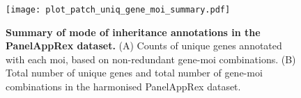 \begin{figure}[ht]
    \centering
    \texttt{[image: plot\_patch\_uniq\_gene\_moi\_summary.pdf]}
\caption{\textbf{Summary of mode of inheritance annotations in the PanelAppRex dataset.}
(A) Counts of unique genes annotated with each \ac{moi}, based on non-redundant gene-\ac{moi} combinations.
(B) Total number of unique genes and total number of gene-\ac{moi} combinations in the harmonised PanelAppRex dataset.
}
    \label{fig:uniq_gene_moi}
\end{figure}



